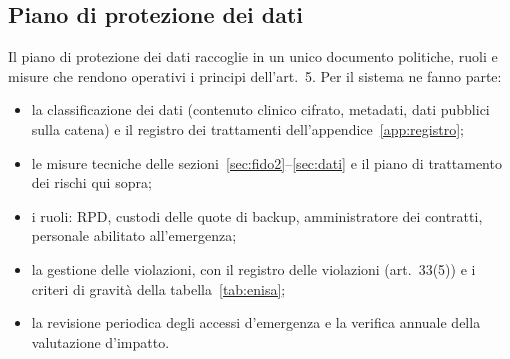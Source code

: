 \subsection{Piano di protezione dei dati}
Il piano di protezione dei dati raccoglie in un unico documento politiche, ruoli e misure che rendono operativi i principi dell'art.~5. Per il sistema ne fanno parte:
\begin{itemize}
  \item la classificazione dei dati (contenuto clinico cifrato, metadati, dati pubblici sulla catena) e il registro dei trattamenti dell'appendice~\ref{app:registro};
  \item le misure tecniche delle sezioni~\ref{sec:fido2}--\ref{sec:dati} e il piano di trattamento dei rischi qui sopra;
  \item i ruoli: RPD, custodi delle quote di backup, amministratore dei contratti, personale abilitato all'emergenza;
  \item la gestione delle violazioni, con il registro delle violazioni (art.~33(5)) e i criteri di gravità della tabella~\ref{tab:enisa};
  \item la revisione periodica degli accessi d'emergenza e la verifica annuale della valutazione d'impatto.
\end{itemize}
